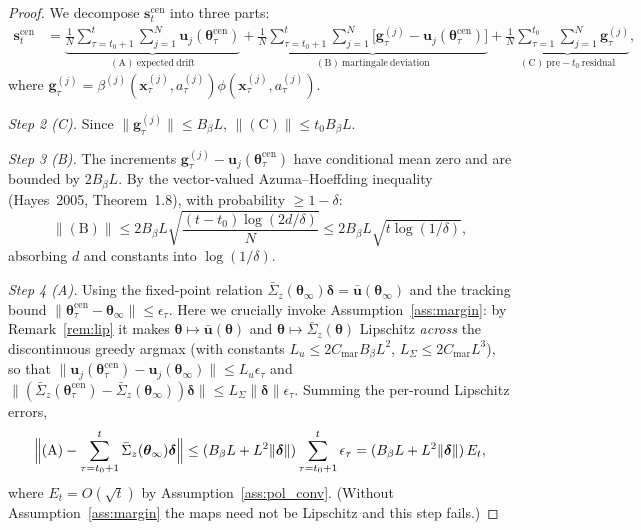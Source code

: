 \documentclass[11pt]{article}
\begin{document}
\begin{proof}
We decompose $\bm{s}_t^{\mathrm{cen}}$ into three parts:
\begin{align*}
\bm{s}_t^{\mathrm{cen}}&=
\underbrace{\frac{1}{N}\sum_{\tau=t_0+1}^t\sum_{j=1}^N
\bm{u}_j(\bm{\theta}_\tau^{\mathrm{cen}})}_{\mathrm{(A)\ expected\ drift}}
+\underbrace{\frac{1}{N}\sum_{\tau=t_0+1}^t\sum_{j=1}^N
\bigl[\bm{g}_\tau^{(j)}-\bm{u}_j(\bm{\theta}_\tau^{\mathrm{cen}})\bigr]}_{\mathrm{(B)\ martingale\ deviation}}
+\underbrace{\frac{1}{N}\sum_{\tau=1}^{t_0}\sum_{j=1}^N
\bm{g}_\tau^{(j)}}_{\mathrm{(C)\ pre-}t_0\mathrm{\ residual}},
\end{align*}
where $\bm{g}_\tau^{(j)}=\beta^{(j)}(\bm{x}_\tau^{(j)},a_\tau^{(j)})
\phi(\bm{x}_\tau^{(j)},a_\tau^{(j)})$.

\textit{Step 2 (C).}  Since $\|\bm{g}_\tau^{(j)}\|\leq B_\beta L$,
$\|(\mathrm{C})\|\leq t_0 B_\beta L$.

\textit{Step 3 (B).}  The increments
$\bm{g}_\tau^{(j)}-\bm{u}_j(\bm{\theta}_\tau^{\mathrm{cen}})$
have conditional mean zero and are bounded by $2B_\beta L$.
By the vector-valued Azuma--Hoeffding inequality (Hayes~2005,
Theorem~1.8), with probability $\geq 1-\delta$:
\[
\|(\mathrm{B})\|\leq 2B_\beta L\sqrt{\frac{(t-t_0)\log(2d/\delta)}{N}}
\leq 2B_\beta L\sqrt{t\log(1/\delta)},
\]
absorbing $d$ and constants into $\log(1/\delta)$.

\textit{Step 4 (A).}  Using the fixed-point relation
$\bar{\Sigma}_z(\bm{\theta}_\infty)\bm{\delta}=\bar{\bm{u}}(\bm{\theta}_\infty)$
and the tracking bound
$\|\bm{\theta}_\tau^{\mathrm{cen}}-\bm{\theta}_\infty\|\leq\epsilon_\tau$.
Here we crucially invoke Assumption~\ref{ass:margin}: by
Remark~\ref{rem:lip} it makes
$\bm{\theta}\mapsto\bar{\bm{u}}(\bm{\theta})$ and
$\bm{\theta}\mapsto\bar{\Sigma}_z(\bm{\theta})$ Lipschitz \emph{across}
the discontinuous greedy argmax (with constants
$L_u\leq 2C_{\mathrm{mar}}B_\beta L^2$,
$L_\Sigma\leq 2C_{\mathrm{mar}}L^3$), so that
$\|\bm{u}_j(\bm{\theta}_\tau^{\mathrm{cen}})-\bm{u}_j(\bm{\theta}_\infty)\|
\leq L_u\epsilon_\tau$ and
$\|(\bar{\Sigma}_z(\bm{\theta}_\tau^{\mathrm{cen}})
-\bar{\Sigma}_z(\bm{\theta}_\infty))\bm{\delta}\|\leq L_\Sigma\|\bm{\delta}\|\epsilon_\tau$.
Summing the per-round Lipschitz errors,
\[
\Bigl\|(\mathrm{A})-\sum_{\tau=t_0+1}^t\bar{\Sigma}_z(\bm{\theta}_\infty)\bm{\delta}\Bigr\|
\leq (B_\beta L+L^2\|\bm{\delta}\|)\sum_{\tau=t_0+1}^t\epsilon_\tau
=(B_\beta L+L^2\|\bm{\delta}\|)\,E_t,
\]
where $E_t=O(\sqrt t)$ by Assumption~\ref{ass:pol_conv}.  (Without
Assumption~\ref{ass:margin} the maps need not be Lipschitz and this
step fails.)


\end{proof}
\end{document}
